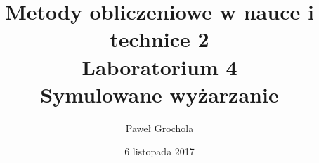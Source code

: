 \documentclass{article}
\title{ \textbf{Metody obliczeniowe w nauce i technice 2} \\ Laboratorium 4 \\ Symulowane wyżarzanie}
\author{
Paweł Grochola
}
\date {6 listopada 2017}
\begin{document}
    \setlength{\fboxsep}{0pt}%
    \setlength{\fboxrule}{0.25pt}%
    \newcommand{\bigplot}[2]{
        \begin{minipage}{\textwidth}
            #2
            \begin{minipage}{.7\linewidth}
                \fbox{\texttt{[image: ../plots/\#1\_plot.png]}}
            \end{minipage}%
        \hspace{1pt}
            \begin{minipage}{.29\linewidth}
                \fbox{\texttt{[image: ../images/\#1\_initial.png]}}
                \vspace{1pt}
                \fbox{\texttt{[image: ../images/\#1\_result.png]}}
            \end{minipage}
        \end{minipage}
    }

    \newcommand{\bigresult}[2]{
    \begin{minipage}{\textwidth}
        \textbf{#2}
        \begin{minipage}{.7\linewidth}
            \fbox{\texttt{[image: ../images/\#1\_result.png]}}
        \end{minipage}%
    \hspace{1pt}
        \begin{minipage}{.29\linewidth}
            \fbox{\texttt{[image: ../images/\#1\_initial.png]}}
            \vspace{1pt}
            \fbox{\texttt{[image: ../plots/\#1\_plot.png]}}
        \end{minipage}
    \end{minipage}
}
\newcommand{\onlyplot}[2]{
    \begin{minipage}{\textwidth}
        \begin{minipage}{.7\linewidth}
            \fbox{\texttt{[image: ../plots/\#1\_plot.png]}}
        \end{minipage}%
        \hspace{1pt}
        \begin{minipage}{.29\linewidth}
            #2
        \end{minipage}
    \end{minipage}
}
   
\maketitle





\end{document}
